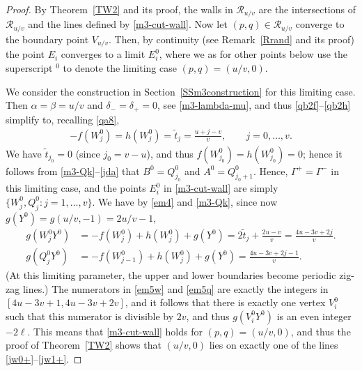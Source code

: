 \documentclass[11pt,reqno,tbtags,a4paper]{amsart}
\numberwithin{equation}{section}
\theoremstyle{plain}%
\theoremstyle{definition}
\theoremstyle{remark}
\newcommand{\refT}[1]{Theorem~\ref{#1}}
\newcommand{\refR}[1]{Remark~\ref{#1}}
\newcommand{\refSS}[1]{Section~\ref{#1}}
\newcommand\set[1]{\ensuremath{\{#1\}}}
\newcommand\ga{\alpha}
\newcommand\gb{\beta}
\newcommand\gG{\Gamma}
\newcommand\cR{{\mathcal R}}
\newcommand\uv{_{u/v}}
\newcommand\ttt{\widetilde t}
\newcommand\oo{^0}
\newcommand\0{{\boldsymbol 0}}
\newcommand\1{{\boldsymbol 1}}
\begin{document}
\begin{proof}
By \refT{TW2} and its proof, the walls in $\cR\uv$ are the intersections
of $\cR\uv$ and the lines defined by \eqref{m3-cut-wall}.
Now let $(p,q)\in\cR\uv$ converge to the boundary point $V\uv$.
Then, by continuity (see \refR{Rrand} and its proof) the point $E_i$
converges to a limit $E_i\oo$, where we as for other points below
use the superscript ${}\oo$ to denote the limiting case
$(p,q)=(u/v,0)$.

We consider the construction in \refSS{SSm3construction} for this limiting
case. 
%
Then
$\ga=\gb=u/v$ and
$\delta_-=\delta_+=0$, see \eqref{m3-lambda-mu},
and thus \eqref{qb2f}--\eqref{qb2h} simplify to, recalling \eqref{qa8}, 
\begin{align}\label{em4}
  -f(W_j\oo)=h(W_j\oo)=\ttt_j = \frac{u+j-v}{v},
\qquad j=0,\dots,v.
\end{align}
We have $\ttt_{j_0}=0$ (since $j_0=v-u$), and thus
$f(W_{j_0}\oo)=h(W_{j_0}\oo)=0$; hence it follows from
\eqref{m3-Qk}--\eqref{jda} that 
$B\oo=Q_{j_0}\oo$ and $A\oo=Q_{j_0+1}\oo$. 
Hence, $\gG^+=\gG^-$ in this limiting case, and
the points $E_i\oo$ in \eqref{m3-cut-wall} are simply
$\set{W_j\oo,Q\oo_j:j=1,\dots,v}$.
%
We have by \eqref{em4} and \eqref{m3-Qk}, since now $g(Y\oo)=g(u/v,-1)=2u/v-1$,
\begin{align}
   \label{em5w}
g(W_j\oo Y\oo)&=-f(W_j\oo)+h(W_j\oo)+g(Y\oo)
=2\ttt_j+\frac{2u-v}{v}=\frac{4u-3v+2j}{v}.
\\\label{em5q}
g(Q_j\oo Y\oo)&=-f(W_{j-1}\oo)+h(W_j\oo)+g(Y\oo)
%
=\frac{4u-3v+2j-1}{v}.
\end{align}
(At this limiting parameter, the upper and lower boundaries become
periodic zig-zag lines.)
The numerators in \eqref{em5w} and \eqref{em5q} are exactly the integers in 
$[4u-3v+1,4u-3v+2v]$, and
it follows that there is exactly one vertex 
$V\oo_i$ such that 
this numerator is divisible by $2v$, and thus $g(V\oo_iY\oo)$ is an even
integer $-2\ell$. This means that \eqref{m3-cut-wall} holds 
for $(p,q)=(u/v,0)$, and thus the proof of \refT{TW2} shows that 
$(u/v,0)$ lies on exactly one of the lines \eqref{jw0+}--\eqref{jw1+}.


\end{proof}
\end{document}
